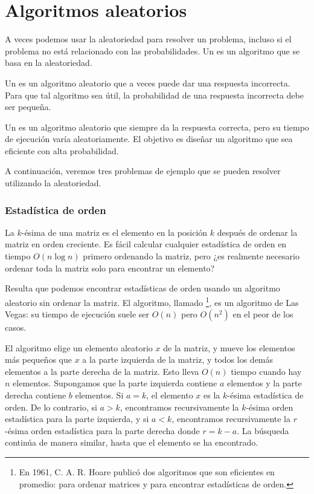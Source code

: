 \section{Algoritmos aleatorios}



A veces podemos usar la aleatoriedad para resolver un problema,
incluso si el problema no está relacionado con las probabilidades.
Un  es un algoritmo que
se basa en la aleatoriedad.


Un  es un algoritmo aleatorio
que a veces puede dar una respuesta incorrecta.
Para que tal algoritmo sea útil,
la probabilidad de una respuesta incorrecta debe ser pequeña.


Un  es un algoritmo aleatorio
que siempre da la respuesta correcta,
pero su tiempo de ejecución varía aleatoriamente.
El objetivo es diseñar un algoritmo que sea
eficiente con alta probabilidad.

A continuación, veremos tres problemas de ejemplo que
se pueden resolver utilizando la aleatoriedad.

\subsubsection{Estadística de orden}


La $k$-ésima  de una matriz
es el elemento en la posición $k$ después de ordenar
la matriz en orden creciente.
Es fácil calcular cualquier estadística de orden
en tiempo $O(n \log n)$ primero ordenando la matriz,
pero ¿es realmente necesario ordenar toda la matriz
solo para encontrar un elemento?

Resulta que podemos encontrar estadísticas de orden
usando un algoritmo aleatorio sin ordenar la matriz.
El algoritmo, llamado \footnote{En 1961,
C. A. R. Hoare publicó dos algoritmos que
son eficientes en promedio:  
 \cite{hoa61a} para ordenar matrices y
 \cite{hoa61b} para encontrar estadísticas de orden.}, es un algoritmo de Las Vegas:
su tiempo de ejecución suele ser $O(n)$
pero $O(n^2)$ en el peor de los casos.

El algoritmo elige un elemento aleatorio $x$
de la matriz, y mueve los elementos más pequeños que $x$
a la parte izquierda de la matriz,
y todos los demás elementos a la parte derecha de la matriz.
Esto lleva $O(n)$ tiempo cuando hay $n$ elementos.
Supongamos que la parte izquierda contiene $a$ elementos
y la parte derecha contiene $b$ elementos.
Si $a=k$, el elemento $x$ es la $k$-ésima estadística de orden.
De lo contrario, si $a>k$, encontramos recursivamente la $k$-ésima orden
estadística para la parte izquierda,
y si $a<k$, encontramos recursivamente la $r$-ésima orden
estadística para la parte derecha donde $r=k-a$.
La búsqueda continúa de manera similar, hasta que el elemento
se ha encontrado.

